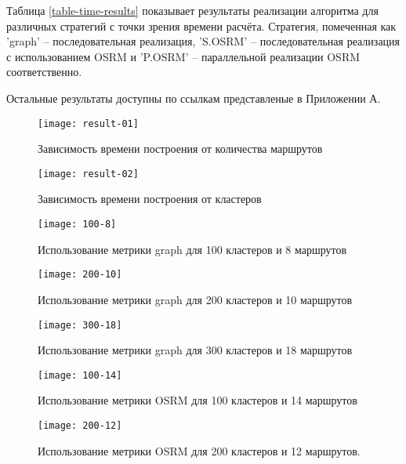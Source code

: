 Таблица \ref{table-time-results} показывает результаты реализации алгоритма для различных стратегий с точки 
зрения времени расчёта. Стратегия, помеченная как 'graph' -- последовательная реализация, 'S.OSRM' -- 
последовательная реализация с использованием OSRM и 'P.OSRM' -- параллельной реализации OSRM соответственно.

Остальные результаты доступны по ссылкам представленые в Приложении А.

\begin{figure}[ht!]
    \centering
    \texttt{[image: result-01]}
    \caption{Зависимость времени построения от количества маршрутов}
    \label{fig:result-01}
\end{figure}

\begin{figure}[ht!]
    \centering
    \texttt{[image: result-02]}
    \caption{Зависимость времени построения от кластеров}
    \label{fig:result-02}
\end{figure}

\begin{figure}[ht!]
    \centering
    \texttt{[image: 100-8]}
    \caption{Использование метрики graph для 100 кластеров и 8 маршрутов}
    \label{fig:network-01a}
\end{figure}

\begin{figure}[ht!]
    \centering
    \texttt{[image: 200-10]}
    \caption{Использование метрики graph для 200 кластеров и 10 маршрутов}
    \label{fig:network-01b}
\end{figure}

\begin{figure}[ht!]
    \centering
    \texttt{[image: 300-18]}
    \caption{Использование метрики graph для 300 кластеров и 18 маршрутов}
    \label{fig:network-01c}
\end{figure}

\begin{figure}[ht!]
    \centering
    \texttt{[image: 100-14]}
    \caption{Использование метрики OSRM для 100 кластеров и 14 маршрутов}
    \label{fig:network-02a}
\end{figure}

\begin{figure}[ht!]
    \centering
    \texttt{[image: 200-12]}
    \caption{Использование метрики OSRM для 200 кластеров и 12 маршрутов.}
    \label{fig:network-02b}
\end{figure}

